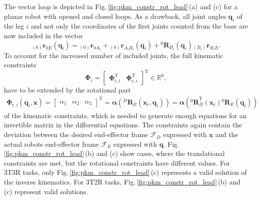 \documentclass[robotics,article,submit,moreauthors,pdftex]{Definitions/mdpi}
\newcommand{\bm}[1]{\boldsymbol{#1}}
\newcommand{\ortvek}[4]{{ }_{(#1)}{\boldsymbol{#2}}^{#3}_{#4} }
\newcommand{\rotmat}[2]{{{ }^{#1}\boldsymbol{R}}_{#2}}
\newcommand{\transp}[0]{{\mathrm{T}}}
\newcommand{\ks}[1]{{\mathcal{F}}_{#1}}
\begin{document}
The vector loop is depicted in Fig.\,\ref{fig:pkm_constr_rot_lead}\,(a) and (c) for a planar robot with opened and closed loops.
As a drawback, all joint angles $\bm{q}_i$ of the leg $i$ and not only the coordinates of the first joints counted from the base are now included in the vector
%
\begin{equation}
\ortvek{0}{r}{}{0E}(\bm{q}_i) = 
\ortvek{0}{r}{}{0A_i}
+ \ortvek{0}{r}{}{A_iB_i}(\bm{q}_i) + \rotmat{0}{B_i}(\bm{q}_i) \ortvek{B_i}{r}{}{B_iE}.
\label{equ:r_0E_i}
\end{equation}
%
To account for the increased number of included joints, the full kinematic constraints
%
\begin{equation}
\bm{\Phi}_i=\begin{bmatrix}
\bm{\Phi}_{\mathrm{t},i}^\transp & \bm{\Phi}_{\mathrm{r},i}^\transp
\end{bmatrix}^\transp \in {\mathbb{R}}^{6},
\label{equ:Phi_def}
\end{equation}
%
have to be extended by the rotational part
%
\begin{align}
\bm{\Phi}_{\mathrm{r},i}(\bm{q}_i,\bm{x})
=
\begin{bmatrix}
\alpha_1  & \alpha_2 & \alpha_3
\end{bmatrix}^\transp
=
\bm{\alpha}\left(\rotmat{D}{E}(\bm{x}_{\mathrm{r}},\bm{q}_i)\right)
=
\bm{\alpha}\left(\rotmat{0}{D}^\transp (\bm{x}_{\mathrm{r}})\rotmat{0}{E}(\bm{q}_i)\right)
\label{equ:Phir_def_i}
\end{align}
%
of the kinematic constraints, which is needed to generate enough equations for an invertible matrix in the differential equations.
The constraints again contain the deviation between the desired end-effector frame $\ks{D}$ expressed with $\bm{x}$ and the actual robots end-effector frame $\ks{E}$ expressed with $\bm{q}$.
Fig.\,\ref{fig:pkm_constr_rot_lead}\,(b) and (c) show cases, where the translational constraints are met, but the rotational constraints have different values.
For 3T3R tasks, only Fig.\,\ref{fig:pkm_constr_rot_lead}\,(c) represents a valid solution of the inverse kinematics. For 3T2R tasks, Fig.\,\ref{fig:pkm_constr_rot_lead}\,(b) and (c) represent valid solutions.
\end{document}
